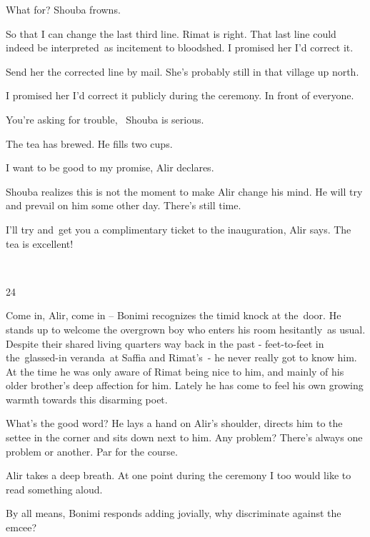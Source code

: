 \documentclass[twoside,11pt]{book}
\begin{document}
{\textquotedbl}What for?{\textquotedbl} Shouba frowns.\ \ 

{\textquotedbl}So that I can change the last third line. Rimat is right. That last line could indeed be interpreted~as
incitement to bloodshed. I promised her I'd correct it.{\textquotedbl} 

{\textquotedbl}Send her the corrected line by mail. She's probably still in that village up north.{\textquotedbl} 

{\textquotedbl}I promised her I'd correct it publicly during the ceremony. In front of everyone.{\textquotedbl}~ 

{\textquotedbl}You're asking for trouble,\ {\textquotedbl} Shouba is serious.

The tea has brewed. He fills two cups. 

{\textquotedbl}I want to be good to my promise,{\textquotedbl} Alir declares.

Shouba realizes this is not the moment to make Alir change his mind. He will try and prevail on him some other day.
There's still time. 

{\textquotedbl}I'll try and~get you a complimentary ticket to the inauguration,{\textquotedbl} Alir says.
{\textquotedbl}The tea is excellent!{\textquotedbl}

~

24~

{\textquotedbl}Come in, Alir, come in -- {\textquotedbl} Bonimi recognizes the timid knock at the~door. He stands up to
welcome the overgrown boy who enters his room hesitantly\ as usual. Despite their shared living quarters way back in
the past - feet-to-feet in the\ glassed-in veranda~at Saffia and Rimat's{\ }{}- he never really got to
know him. At the time he was only aware of Rimat being nice to him, and mainly of his older brother's deep affection
for him. Lately he has come to feel his own growing warmth towards this disarming poet. 

{\textquotedbl}What's the good word?{\textquotedbl} He lays a hand on Alir's shoulder, directs him to the settee in the
corner and sits down next to him. {\textquotedbl}Any problem? There's always one problem or another. Par for the
course.{\textquotedbl} 

Alir takes a deep breath. {\textquotedbl}At one point during the ceremony I too would like to read something
aloud.{\textquotedbl} 

{\textquotedbl}By all means,{\textquotedbl} Bonimi responds adding jovially, {\textquotedbl}why discriminate against the
emcee?{\textquotedbl} 
\end{document}
